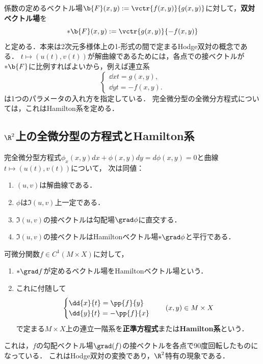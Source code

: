 \documentclass[uplatex,dvipdfmx]{jsreport}
\begin{document}
\begin{observation}
    係数の定めるベクトル場$\b{F}(x,y):=\vctr{f(x,y)}{g(x,y)}$に対して，\textbf{双対ベクトル場}を
    \[*\b{F}(x,y):=\vctr{g(x,y)}{-f(x,y)}\]
    と定める．本来は2次元多様体上の1-形式の間で定まるHodge双対の概念である．
    $t\mapsto(u(t),v(t))$が解曲線であるためには，各点での接ベクトルが$*\b{F}$に比例すればよいから，例えば連立系
    \[\begin{cases}
        \dd{x}{t}=g(x,y),\\
        \dd{y}{t}=-f(x,y).
    \end{cases}\]
    は1つのパラメータの入れ方を指定している．
    完全微分型の全微分方程式については，これはHamilton系を定める．
\end{observation}

\subsection{$\R^2$上の全微分型の方程式とHamilton系}

\begin{proposition}
    完全微分型方程式$\phi_x(x,y)dx+\phi(x,y)dy=d\phi(x,y)=0$と曲線$t\mapsto(u(t),v(t))$について，
    次は同値：
    \begin{enumerate}
        \item $(u,v)$は解曲線である．
        \item $\phi$は$\Im(u,v)$上一定である．
        \item $\Im(u,v)$の接ベクトルは勾配場$\grad\phi$に直交する．
        \item $\Im(u,v)$の接ベクトルはHamiltonベクトル場$*\grad\phi$と平行である．
    \end{enumerate}
\end{proposition}


\begin{definition}\label{def-Hamilton-vector-field}
    可微分関数$f\in C^1(M\times X)$に対して，
    \begin{enumerate}
        \item $*\grad f$が定めるベクトル場をHamiltonベクトル場という．
        \item これに付随して
        \[\begin{cases}
            \dd{x}{t}=\pp{f}{y}\\
            \dd{y}{t}=-\pp{f}{x}
        \end{cases}\quad(x,y)\in M\times X\]
        で定まる$M\times X$上の連立一階系を\textbf{正準方程式}または\textbf{Hamilton系}という．
    \end{enumerate}
\end{definition}
\begin{remarks}
    これは，$f$の勾配ベクトル場$\grad(f)$の接ベクトルを各点で90度回転したものになっている．
    これはHodge双対の変換であり，$\R^2$特有の現象である．
\end{remarks}
\end{document}
